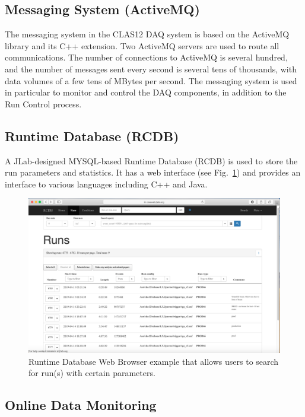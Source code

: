 \subsection{Messaging System (ActiveMQ)}

The messaging system in the CLAS12 DAQ system is based on the ActiveMQ library and its C++ extension. Two
ActiveMQ servers are used to route all communications. The number of connections to ActiveMQ is several hundred, and
the number of messages sent every second is several tens of thousands, with data volumes of a few tens of MBytes per
second. The messaging system is used in particular to monitor and control the DAQ components, in addition to the Run
Control process.

\subsection{Runtime Database (RCDB)}

A JLab-designed MYSQL-based Runtime Database (RCDB) is used to store the run parameters and statistics. It has a
web interface (see Fig.~\ref{fig:rcdb}) and provides an interface to various languages including C++ and Java.

\begin{figure}[hbt]
	\centering
	\includegraphics[width=\textwidth]{img/rcdb.png}
	\caption{Runtime Database Web Browser example that allows users to search for run(s) with certain parameters.}
	\label{fig:rcdb}
\end{figure}

\subsection{Online Data Monitoring}

